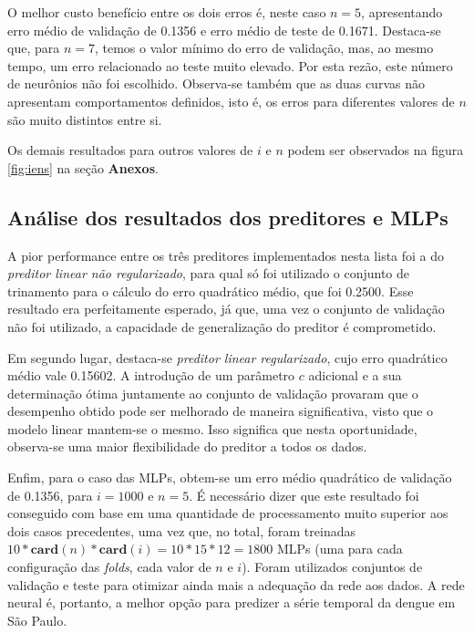 O melhor custo benefício entre os dois erros é, neste caso \(n = 5\),
apresentando erro médio de validação de 0.1356 e erro médio de teste de 0.1671.
Destaca-se que, para \(n=7\), temos o valor mínimo do erro de validação, mas, ao
mesmo tempo, um erro relacionado ao teste muito elevado. Por esta rezão, este
número de neurônios não foi escolhido.  Observa-se também que as duas curvas não
apresentam comportamentos definidos, isto é, os erros para diferentes valores de
\(n\) são muito distintos entre si.

\vspace{12pt}

Os demais resultados para outros valores de \(i\) e \(n\) podem ser observados
na figura \ref{fig:iens} na seção \textbf{Anexos}. 

\subsection{Análise dos resultados dos preditores e MLPs}
\label{sec:comparacao}

A pior performance entre os três preditores implementados nesta lista foi a do
\textit{preditor linear não regularizado}, para qual só foi utilizado o conjunto
de trinamento para o cálculo do erro quadrático médio, que foi 0.2500. Esse resultado era
perfeitamente esperado, já que, uma vez o conjunto de validação não foi
utilizado, a capacidade de generalização do preditor é comprometido. 

\vspace{12pt}

Em segundo lugar, destaca-se \textit{preditor linear regularizado}, cujo erro
quadrático médio vale 0.15602. A introdução de um parâmetro \(c\) adicional e a
sua determinação ótima juntamente ao conjunto de validação provaram que o
desempenho obtido pode ser melhorado de maneira significativa, visto que o
modelo linear mantem-se o mesmo. Isso significa que nesta oportunidade,
observa-se uma maior flexibilidade do preditor a todos os dados.

\vspace{12pt}

Enfim, para o caso das MLPs, obtem-se um erro médio quadrático de validação de
0.1356, para \(i=1000\) e \(n=5\). É necessário dizer que este resultado foi
conseguido com base em uma quantidade de processamento muito superior aos dois
casos precedentes, uma vez que, no total, foram treinadas
\(10*\mathbf{card}(n)*\mathbf{card}(i) = 10*15*12 = 1800\) MLPs (uma para cada
configuração das \textit{folds}, cada valor de \(n\) e \(i\)). Foram utilizados
conjuntos de validação e teste para otimizar ainda mais a adequação da rede aos
dados. A rede neural é, portanto, a melhor opção para predizer a série temporal
da dengue em São Paulo.
